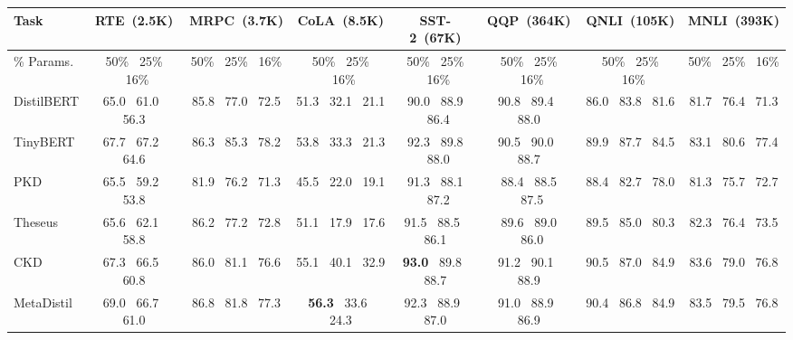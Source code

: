\begin{table*}[t]
	\centering
	\scriptsize
	\begin{tabular}{l|ccccccc}
				\toprule
		Task &\textbf{RTE~(2.5K)} &\textbf{MRPC~(3.7K)} &\textbf{CoLA~(8.5K)} & \textbf{SST-2~(67K)}                                                  & \textbf{QQP~(364K)}                                                    & \textbf{QNLI~(105K)}                                                & \textbf{MNLI~(393K) }                                                    \\
				\midrule
		\% Params.   &50\% ~25\%  ~16\% &50\% ~25\%  ~16\% &50\% ~25\%  ~16\%            &50\% ~25\%  ~16\%             &50\% ~25\%  ~16\%            &50\% ~25\%  ~16\%            &50\% ~25\%  ~16\%        \\
		\hline
		DistilBERT  &65.0~ 61.0~ 56.3 &85.8~ 77.0~ 72.5 &51.3~ 32.1~ 21.1    & 90.0 ~88.9 ~86.4          & 90.8~ 89.4~ 88.0          & 86.0~ 83.8~ 81.6         & 81.7 ~76.4 ~71.3         \\
		TinyBERT    &67.7~ 67.2~ 64.6 &86.3~ 85.3~ 78.2 &53.8~ 33.3 ~21.3   & 92.3 ~89.8 ~88.0          & 90.5~ 90.0~ 88.7          & 89.9 ~87.7~ 84.5          & 83.1~ 80.6~ 77.4           \\
		\hline
		PKD  &65.5~ 59.2~ 53.8 &81.9~ 76.2~ 71.3 &45.5~ 22.0~ 19.1   & 91.3~ 88.1 ~87.2          & 88.4~ 88.5 ~87.5          & 88.4~ 82.7~ 78.0          & 81.3 ~75.7~ 72.7                                                  \\
		Theseus &65.6~ 62.1~ 58.8 &86.2~ 77.2~ 72.8 &51.1~ 17.9~ 17.6  & 91.5~ 88.5~ 86.1          & 89.6 ~89.0 ~86.0          & 89.5 ~85.0~ 80.3          & 82.3~ 76.4 ~73.5                                         \\
		CKD   &67.3~ 66.5~ 60.8 &86.0~ 81.1~ 76.6 &55.1~ 40.1~ 32.9   & \textbf{93.0} ~89.8~ 88.7          & 91.2~ 90.1~ 88.9          & 90.5~ 87.0 ~84.9          & 83.6 ~79.0~ 76.8                                \\
		MetaDistil  &69.0~ 66.7~ 61.0 &86.8~ 81.8~ 77.3 &\textbf{56.3}~ 33.6~ 24.3    & 92.3 ~88.9~ 87.0          & 91.0~ 88.9~ 86.9          & 90.4~ 86.8 ~84.9          & 83.5 ~79.5~ 76.8                             \\
		\hline

\end{tabular}
\end{table*}
